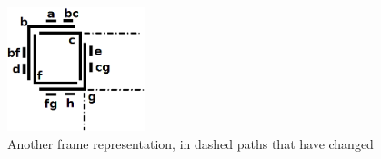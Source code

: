 \begin{figure}[htb]	
\center%
\includegraphics[width=4cm]{./img/outraRepresentacaoFrame.png}
\caption{Another frame representation, in dashed paths that have changed}
\label{fig:outraRepresentacaoFrame}
\end{figure}
